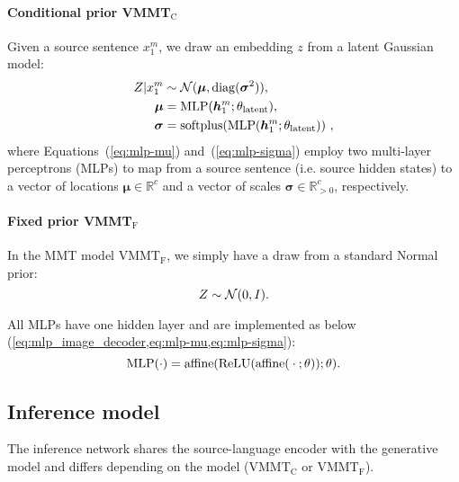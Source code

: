 \documentclass[11pt,a4paper]{article}
\DeclareMathOperator{\softplus}{softplus}
\DeclareMathOperator{\diag}{diag}
\DeclareMathOperator{\affine}{affine}
\DeclareMathOperator{\ReLU}{ReLU}
\DeclareMathOperator{\MLP}{MLP}
\newcommand{\cond}{VMMT$_{\text{C}}$\xspace}
\newcommand{\uncond}{VMMT$_{\text{F}}$\xspace}
\begin{document}
\paragraph{Conditional prior \cond}
Given a source sentence $x_1^m$, we draw an embedding $z$ from a latent Gaussian model:
\begin{align}
	Z|x_1^m &\sim \mathcal N(\boldsymbol\mu, \diag(\boldsymbol\sigma^2)), \notag\\
    \boldsymbol\mu &= \MLP(\bm{h}_1^m; \theta_\text{latent}), \label{eq:mlp-mu} \\
    \boldsymbol\sigma &= \softplus(\MLP(\bm{h}_1^m; \theta_\text{latent})) ~, \label{eq:mlp-sigma}
\end{align}
where Equations~(\ref{eq:mlp-mu}) and~(\ref{eq:mlp-sigma}) employ two multi-layer perceptrons (MLPs) to map from a source sentence (i.e. source hidden states) to a vector of locations $\boldsymbol\mu \in \mathbb R^c$ and a vector of scales $\boldsymbol\sigma \in \mathbb R^c_{>0}$, respectively.

\paragraph{Fixed prior \uncond}
In the MMT model \uncond, we simply have a draw from a standard Normal prior:
\begin{equation}
	Z \sim \mathcal N(0, I). \notag\\
\end{equation}


All MLPs have one hidden layer and are implemented as below (\cref{eq:mlp_image_decoder,eq:mlp-mu,eq:mlp-sigma}):
\begin{equation}
    \MLP(\cdot) = \affine(\ReLU(\affine(\: \cdot\: ; \theta)); \theta).\notag
\end{equation}




\subsection{Inference model}
The inference network shares the source-language encoder with the generative model and differs depending on the model (\cond or \uncond).
\end{document}
